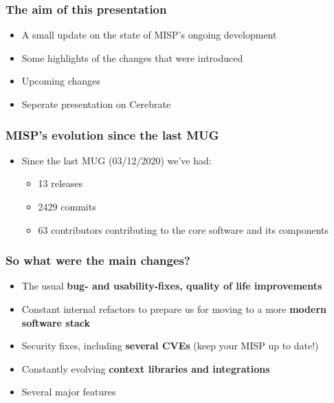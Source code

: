 
\begin{frame}
\titlepage
\end{frame}

\begin{frame}
  \frametitle{The aim of this presentation}
  \begin{itemize}
     \item A small update on the state of MISP's ongoing development
     \item Some highlights of the changes that were introduced
     \item Upcoming changes
     \item Seperate presentation on Cerebrate
  \end{itemize}
\end{frame}

\begin{frame}
  \frametitle{MISP's evolution since the last MUG}
  \begin{itemize}
    \item Since the last MUG (03/12/2020) we've had:
    \begin{itemize}
        \item 13 releases
        \item 2429 commits
        \item 63 contributors contributing to the core software and its components
    \end{itemize}
  \end{itemize}
\end{frame}

\begin{frame}
  \frametitle{So what were the main changes?}
  \begin{itemize}
     \item The usual {\bf bug- and usability-fixes, quality of life improvements}
     \item Constant internal refactors to prepare us for moving to a more {\bf modern software stack}
     \item Security fixes, including {\bf several CVEs} (keep your MISP up to date!)
     \item Constantly evolving {\bf context libraries and integrations}
     \item Several major features
  \end{itemize}
\end{frame}

